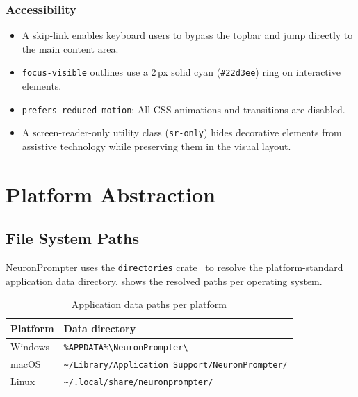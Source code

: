 \documentclass[a4paper, 11pt, oneside]{report}
\begin{document}
\subsection{Accessibility}

\begin{itemize}
  \item A skip-link enables keyboard users to bypass the topbar and jump
        directly to the main content area.
  \item \texttt{focus-visible} outlines use a 2\,px solid cyan
        (\texttt{\#22d3ee}) ring on interactive elements.
  \item \texttt{prefers-reduced-motion}: All CSS animations and transitions
        are disabled.
  \item A screen-reader-only utility class (\texttt{sr-only}) hides
        decorative elements from assistive technology while preserving them
        in the visual layout.
\end{itemize}


\chapter{Platform Abstraction}
\label{ch:platform}

\section{File System Paths}
\label{sec:fs-paths}

NeuronPrompter uses the \texttt{directories} crate~\cite{directories} to
resolve the platform-standard application data directory.
 shows the resolved paths per operating system.

\begin{table}[H]
  \centering
  \caption{Application data paths per platform}
  \label{tab:paths}
  \begin{tabularx}{\textwidth}{l X}
    \toprule
    \textbf{Platform} & \textbf{Data directory} \\
    \midrule
    Windows & \texttt{\%APPDATA\%\textbackslash NeuronPrompter\textbackslash} \\
    macOS   & \texttt{\textasciitilde/Library/Application Support/NeuronPrompter/} \\
    Linux   & \texttt{\textasciitilde/.local/share/neuronprompter/} \\
    \bottomrule
  \end{tabularx}
\end{table}
\end{document}
